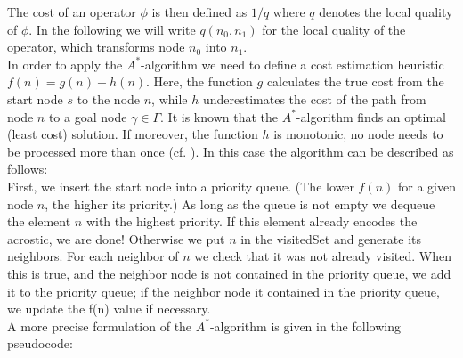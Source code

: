 \documentclass[11pt]{reportAlternative}
\begin{document}
The cost of an operator $\phi$ is then defined as $1/q$ where $q$ denotes the local quality of $\phi$. In the following we will write $q(n_0,n_1)$ for the local quality of the operator, which transforms node $n_0$ into $n_1$.\\
In order to apply the $A^*$-algorithm we need to define a cost estimation heuristic $f(n)=g(n)+h(n)$. Here, the function $g$ calculates the true cost from the start node $s$ to
the node $n$, while $h$ underestimates the cost of the path from node $n$ to a goal node $\gamma\in\Gamma$. It is known that the $A^*$-algorithm finds an optimal (least cost) solution. If moreover, the function $h$ is monotonic, no node needs to be processed more than once (cf. \cite{AstarAlgorithm}). In this case the algorithm can be described as follows:\\

First, we insert the start node into a priority queue. (The lower $f(n)$ for a given node $n$, the higher its priority.) As long as the queue is not empty we dequeue the element $n$ with the highest priority. If this element already encodes the acrostic, we are done! Otherwise we put $n$ in the
visitedSet and generate its neighbors. For each neighbor of $n$ we check that it was not already visited. When this is true, and the neighbor node is not contained in the priority queue, we add it to the priority queue; if the neighbor node it contained in the priority queue, we update the f(n) value if necessary.\\

A more precise formulation of the $A^*$-algorithm is given in the following pseudocode:\\

\newpage
\end{document}
